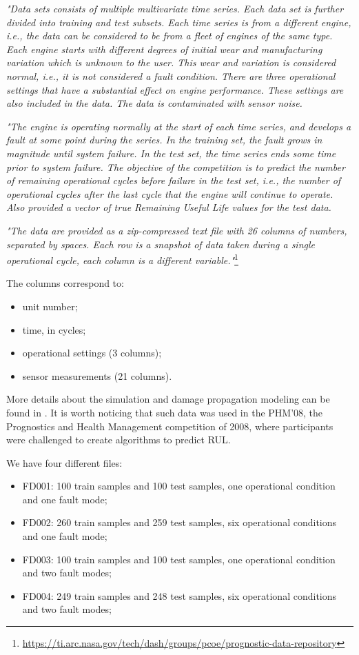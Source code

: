 \documentclass[letterpaper, 10 pt, conference, onecolumn]{ieeeconf}  %
\begin{document}
\textit{"Data sets consists of multiple multivariate time series. Each data set is further divided into training and test subsets. Each time series is from a different engine, i.e., the data can be considered to be from a fleet of engines of the same type. Each engine starts with different degrees of initial wear and manufacturing variation which is unknown to the user. This wear and variation is considered normal, i.e., it is not considered a fault condition. There are three operational settings that have a substantial effect on engine performance. These settings are also included in the data. The data is contaminated with sensor noise.}

\textit{"The engine is operating normally at the start of each time series, and develops a fault at some point during the series. In the training set, the fault grows in magnitude until system failure. In the test set, the time series ends some time prior to system failure. The objective of the competition is to predict the number of remaining operational cycles before failure in the test set, i.e., the number of operational cycles after the last cycle that the engine will continue to operate. Also provided a vector of true Remaining Useful Life values for the test data.}

\textit{"The data are provided as a zip-compressed text file with 26 columns of numbers, separated by spaces. 
Each row is a snapshot of data taken during a single operational cycle, each column is a different variable."}\footnote{\url{https://ti.arc.nasa.gov/tech/dash/groups/pcoe/prognostic-data-repository}}

The columns correspond to:
\begin{itemize}
\item unit number;
\item time, in cycles;
\item operational settings (3 columns);
\item sensor measurements (21 columns).
\end{itemize}

More details about the simulation and damage propagation modeling can be found in \cite{saxena2008damage}. It is worth noticing that such data was used in the PHM'08, the Prognostics and Health Management competition of 2008, where participants were challenged to create algorithms to predict RUL.

We have four different files:

\begin{itemize}
\item FD001: 100 train samples and 100 test samples, one operational condition and one fault mode;
\item FD002: 260 train samples and 259 test samples, six operational conditions and one fault mode;
\item FD003: 100 train samples and 100 test samples, one operational condition and two fault modes;
\item FD004: 249 train samples and 248 test samples, six operational conditions and two fault modes;
\end{itemize}
\end{document}
